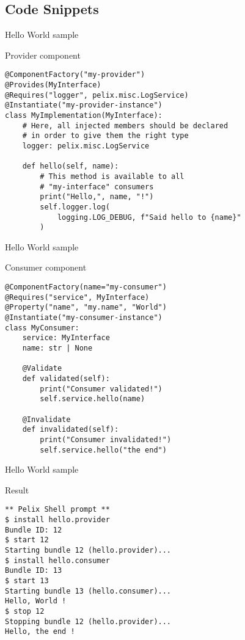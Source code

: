 \subsection{Code Snippets}

\begin{frame}[fragile]{Hello World sample}
\begin{block}{Provider component}
\begin{verbatim}
@ComponentFactory("my-provider")
@Provides(MyInterface)
@Requires("logger", pelix.misc.LogService)
@Instantiate("my-provider-instance")
class MyImplementation(MyInterface):
    # Here, all injected members should be declared
    # in order to give them the right type
    logger: pelix.misc.LogService

    def hello(self, name):
        # This method is available to all
        # "my-interface" consumers
        print("Hello,", name, "!")
        self.logger.log(
            logging.LOG_DEBUG, f"Said hello to {name}"
        )
\end{verbatim}
\end{block}
\end{frame}

\begin{frame}[fragile]{Hello World sample}
\begin{block}{Consumer component}
\begin{verbatim}
@ComponentFactory(name="my-consumer")
@Requires("service", MyInterface)
@Property("name", "my.name", "World")
@Instantiate("my-consumer-instance")
class MyConsumer:
    service: MyInterface
    name: str | None

    @Validate
    def validated(self):
        print("Consumer validated!")
        self.service.hello(name)

    @Invalidate
    def invalidated(self):
        print("Consumer invalidated!")
        self.service.hello("the end")
\end{verbatim}
\end{block}
\end{frame}


\begin{frame}[fragile]{Hello World sample}
\begin{block}{Result}
\begin{verbatim}
** Pelix Shell prompt **
$ install hello.provider
Bundle ID: 12
$ start 12
Starting bundle 12 (hello.provider)...
$ install hello.consumer
Bundle ID: 13
$ start 13
Starting bundle 13 (hello.consumer)...
Hello, World !
$ stop 12
Stopping bundle 12 (hello.provider)...
Hello, the end !
\end{verbatim}
\end{block}
\end{frame}
